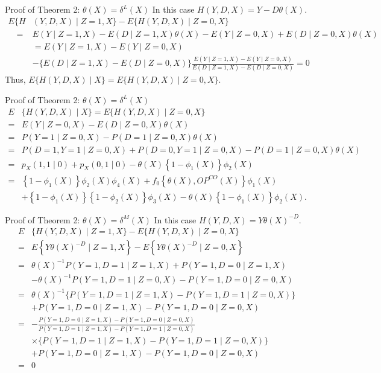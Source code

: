 \documentclass[aspectratio=169,xcolor=dvipsnames]{beamer}
\begin{document}
\begin{frame}{Proof of Theorem 2: $\theta(X)=\delta^{L}(X)$}
In this case $H(Y, D, X)=Y-D \theta(X)$.
$$
\begin{aligned}
E\{H&(Y, D, X) \mid Z=1, X\}-E\{H(Y, D, X) \mid Z=0, X\} \\
\quad=& E(Y \mid Z=1, X)-E(D \mid Z=1, X) \theta(X)-E(Y \mid Z=0, X)+E(D \mid Z=0, X) \theta(X) \\
&=E(Y \mid Z=1, X)-E(Y \mid Z=0, X) \\
&-\{E(D \mid Z=1, X)-E(D \mid Z=0, X)\} \frac{E(Y \mid Z=1, X)-E(Y \mid Z=0, X)}{E(D \mid Z=1, X)-E(D \mid Z=0, X)}=0
\end{aligned}
$$
Thus, $E\{H(Y, D, X) \mid X\}=E\{H(Y, D, X) \mid Z=0, X\}$. 
\end{frame}

\begin{frame}{Proof of Theorem 2: $\theta(X)=\delta^{L}(X)$}
$$
\begin{aligned}
E&\{H(Y, D, X) \mid X\}=E\{H(Y, D, X) \mid Z=0, X\} \\
=&E(Y \mid Z=0, X)-E(D \mid Z=0, X) \theta(X)\\
=& P(Y=1 \mid Z=0, X)-P(D=1 \mid Z=0, X) \theta(X) \\
=& P(D=1, Y=1 \mid Z=0, X)+P(D=0, Y=1 \mid Z=0, X)-P(D=1 \mid Z=0, X) \theta(X) \\
=& p_{X}(1,1 \mid 0)+p_{X}(0,1 \mid 0)-\theta(X)\left\{1-\phi_{1}(X)\right\} \phi_{2}(X) \\
=&\left\{1-\phi_{1}(X)\right\} \phi_{2}(X) \phi_{4}(X)+f_{0}\left\{\theta(X), O P^{C O}(X)\right\} \phi_{1}(X) \\
&+\left\{1-\phi_{1}(X)\right\}\left\{1-\phi_{2}(X)\right\} \phi_{3}(X)-\theta(X)\left\{1-\phi_{1}(X)\right\} \phi_{2}(X) .
\end{aligned}
$$    
\end{frame}

\begin{frame}{Proof of Theorem 2: $\theta(X)=\delta^{M}(X)$}
In this case $H(Y, D, X)=Y \theta(X)^{-D}$.
$$
\begin{aligned}
E&\{H(Y, D, X) \mid Z=1, X\}-E\{H(Y, D, X) \mid Z=0, X\} \\
=& E\left\{Y \theta(X)^{-D} \mid Z=1, X\right\}-E\left\{Y \theta(X)^{-D} \mid Z=0, X\right\} \\
=& \theta(X)^{-1} P(Y=1, D=1 \mid Z=1, X)+P(Y=1, D=0 \mid Z=1, X) \\
&-\theta(X)^{-1} P(Y=1, D=1 \mid Z=0, X)-P(Y=1, D=0 \mid Z=0, X) \\
=& \theta(X)^{-1}\{P(Y=1, D=1 \mid Z=1, X)-P(Y=1, D=1 \mid Z=0, X)\} \\
&+P(Y=1, D=0 \mid Z=1, X)-P(Y=1, D=0 \mid Z=0, X) \\
=&-\frac{P(Y=1, D=0 \mid Z=1, X)-P(Y=1, D=0 \mid Z=0, X)}{P(Y=1, D=1 \mid Z=1, X)-P(Y=1, D=1 \mid Z=0, X)} \\
& \times\{P(Y=1, D=1 \mid Z=1, X)-P(Y=1, D=1 \mid Z=0, X)\} \\
&+P(Y=1, D=0 \mid Z=1, X)-P(Y=1, D=0 \mid Z=0, X) \\
=& 0
\end{aligned}
$$
\end{frame}
\end{document}
